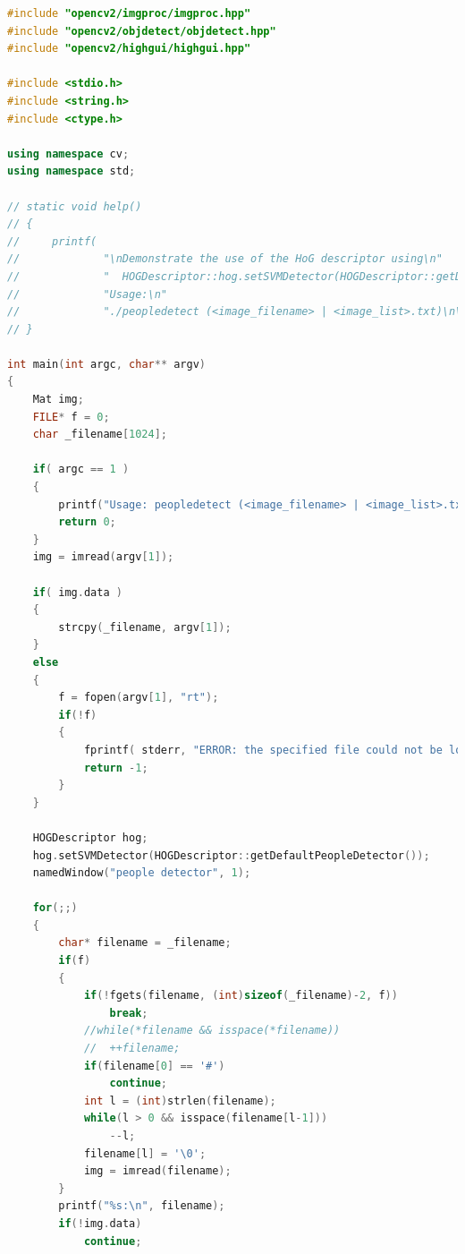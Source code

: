 \documentclass[10pt,technote,onecolumn,twoside]{IEEEtran}
\begin{document}
\begin{lstlisting}[language=C++]
#include "opencv2/imgproc/imgproc.hpp"
#include "opencv2/objdetect/objdetect.hpp"
#include "opencv2/highgui/highgui.hpp"

#include <stdio.h>
#include <string.h>
#include <ctype.h>

using namespace cv;
using namespace std;

// static void help()
// {
//     printf(
//             "\nDemonstrate the use of the HoG descriptor using\n"
//             "  HOGDescriptor::hog.setSVMDetector(HOGDescriptor::getDefaultPeopleDetector());\n"
//             "Usage:\n"
//             "./peopledetect (<image_filename> | <image_list>.txt)\n\n");
// }

int main(int argc, char** argv)
{
    Mat img;
    FILE* f = 0;
    char _filename[1024];

    if( argc == 1 )
    {
        printf("Usage: peopledetect (<image_filename> | <image_list>.txt)\n");
        return 0;
    }
    img = imread(argv[1]);

    if( img.data )
    {
        strcpy(_filename, argv[1]);
    }
    else
    {
        f = fopen(argv[1], "rt");
        if(!f)
        {
            fprintf( stderr, "ERROR: the specified file could not be loaded\n");
            return -1;
        }
    }

    HOGDescriptor hog;
    hog.setSVMDetector(HOGDescriptor::getDefaultPeopleDetector());
    namedWindow("people detector", 1);

    for(;;)
    {
        char* filename = _filename;
        if(f)
        {
            if(!fgets(filename, (int)sizeof(_filename)-2, f))
                break;
            //while(*filename && isspace(*filename))
            //  ++filename;
            if(filename[0] == '#')
                continue;
            int l = (int)strlen(filename);
            while(l > 0 && isspace(filename[l-1]))
                --l;
            filename[l] = '\0';
            img = imread(filename);
        }
        printf("%s:\n", filename);
        if(!img.data)
            continue;


\end{lstlisting}
\end{document}
